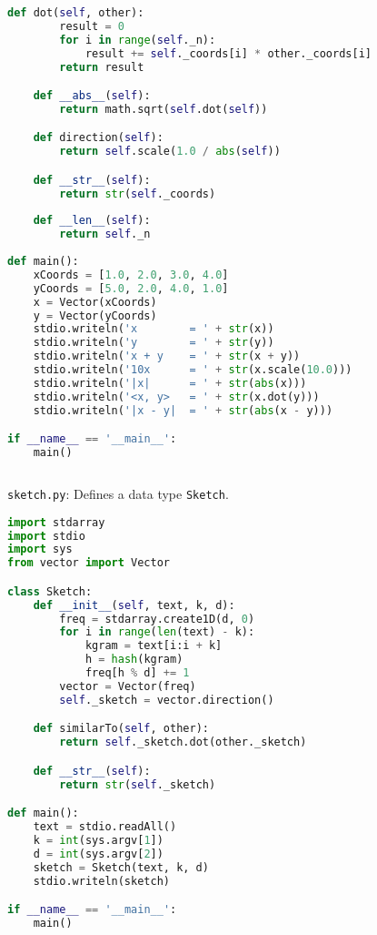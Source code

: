 \documentclass[8pt,a4paper,compress,handout]{beamer}
\begin{document}
\begin{frame}[fragile]
\begin{lstlisting}[language=Python]
    def dot(self, other):
        result = 0
        for i in range(self._n):
            result += self._coords[i] * other._coords[i]
        return result

    def __abs__(self):
        return math.sqrt(self.dot(self))

    def direction(self):
        return self.scale(1.0 / abs(self))

    def __str__(self):
        return str(self._coords)
        
    def __len__(self):
        return self._n
        
def main():
    xCoords = [1.0, 2.0, 3.0, 4.0]
    yCoords = [5.0, 2.0, 4.0, 1.0]
    x = Vector(xCoords)
    y = Vector(yCoords)
    stdio.writeln('x        = ' + str(x))
    stdio.writeln('y        = ' + str(y))
    stdio.writeln('x + y    = ' + str(x + y))
    stdio.writeln('10x      = ' + str(x.scale(10.0)))
    stdio.writeln('|x|      = ' + str(abs(x)))
    stdio.writeln('<x, y>   = ' + str(x.dot(y)))
    stdio.writeln('|x - y|  = ' + str(abs(x - y)))

if __name__ == '__main__':
    main()
\end{lstlisting}

\begin{lstlisting}[language={}]

\end{lstlisting}
\end{frame}

\begin{frame}[fragile]
\begin{framed}
\tiny \lstinline{sketch.py}: Defines a data type \lstinline{Sketch}. 
\end{framed}

\begin{lstlisting}[language=Python]
import stdarray
import stdio
import sys
from vector import Vector

class Sketch:
    def __init__(self, text, k, d):
        freq = stdarray.create1D(d, 0)
        for i in range(len(text) - k):
            kgram = text[i:i + k]
            h = hash(kgram)
            freq[h % d] += 1
        vector = Vector(freq)
        self._sketch = vector.direction()

    def similarTo(self, other):
        return self._sketch.dot(other._sketch)

    def __str__(self):
        return str(self._sketch)

def main():
    text = stdio.readAll()
    k = int(sys.argv[1])
    d = int(sys.argv[2])
    sketch = Sketch(text, k, d)
    stdio.writeln(sketch)

if __name__ == '__main__':
    main()
\end{lstlisting}
\end{frame}
\end{document}
